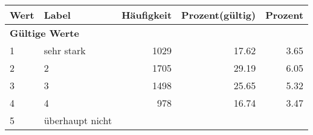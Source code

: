      \begin{longtable}{lXrrr}
     \toprule
     \textbf{Wert} & \textbf{Label} & \textbf{Häufigkeit} & \textbf{Prozent(gültig)} & \textbf{Prozent} \\
     \endhead
     \midrule
     \multicolumn{5}{l}{\textbf{Gültige Werte}}\\

     1 &
     \multicolumn{1}{X}{ sehr stark   } &


       \num{1029} &
       \num[round-mode=places,round-precision=2]{17.62} &
         \num[round-mode=places,round-precision=2]{3.65} \\

     2 &
     \multicolumn{1}{X}{ 2   } &


       \num{1705} &
       \num[round-mode=places,round-precision=2]{29.19} &
         \num[round-mode=places,round-precision=2]{6.05} \\

     3 &
     \multicolumn{1}{X}{ 3   } &


       \num{1498} &
       \num[round-mode=places,round-precision=2]{25.65} &
         \num[round-mode=places,round-precision=2]{5.32} \\

     4 &
     \multicolumn{1}{X}{ 4   } &


       \num{978} &
       \num[round-mode=places,round-precision=2]{16.74} &
         \num[round-mode=places,round-precision=2]{3.47} \\

     5 &
     \multicolumn{1}{X}{ überhaupt nicht   } &



\end{longtable}
